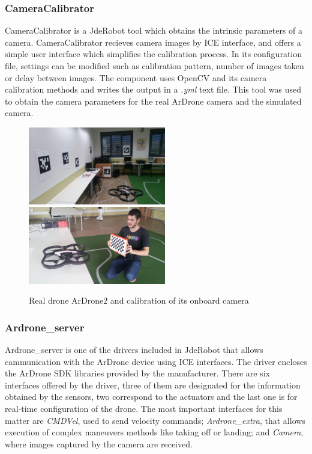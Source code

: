 \documentclass{styles/svproc}
\begin{document}
\subsubsection{CameraCalibrator}

	CameraCalibrator is a JdeRobot tool which obtains the intrinsic parameters of a camera. CameraCalibrator recieves camera images by ICE interface, and offers a simple user interface which simplifies the calibration process. In its configuration file, settings can be modified such as calibration pattern, number of images taken or delay between images. The component uses OpenCV and its camera calibration methods and writes the output in a \textit{.yml} text file. This tool was used to obtain the camera parameters for the real ArDrone camera and the simulated camera.

	\begin{figure}[h]
		\begin{center}
                  {\includegraphics[width=6cm]{realnavigation.png}}
                  {\includegraphics[width=6cm]{calibration.jpg}}
		\end{center}
		\caption{Real drone ArDrone2 and calibration of its onboard camera}
	\end{figure}

\subsubsection{Ardrone\_server}

	Ardrone\_server is one of the drivers included in JdeRobot that allows cammunication with the ArDrone device using ICE interfaces. The driver encloses the ArDrone SDK libraries provided by the manufacturer. There are six interfaces offered by the driver, three of them are designated for the information obtained by the sensors, two correspond to the actuators and the last one is for real-time configuration of the drone. The most important interfaces for this matter are \textit{CMDVel}, used to send velocity commands; \textit{Ardrone\_extra}, that allows execution of complex maneuvers methods like taking off or landing; and \textit{Camera}, where images captured by the camera are received.
\end{document}
